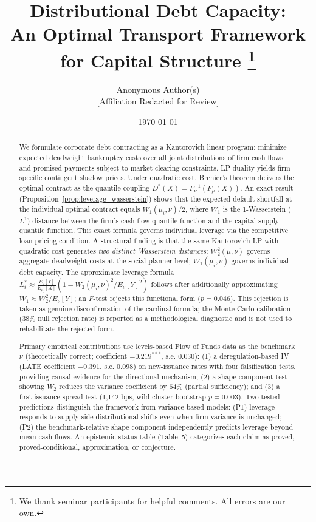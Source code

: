 \documentclass[12pt]{article}
\title{%
  \textbf{Distributional Debt Capacity:\\
  An Optimal Transport Framework for Capital Structure}%
  \thanks{We thank seminar participants for helpful comments. All errors are our own.}
}
\author{%
  Anonymous Author(s)\\
  \small{[Affiliation Redacted for Review]}
}
\date{\today}
\theoremstyle{definition}
\theoremstyle{remark}
\begin{document}
\maketitle
\thispagestyle{empty}

\begin{abstract}
We formulate corporate debt contracting as a Kantorovich linear program: minimize expected deadweight bankruptcy costs over all joint distributions of firm cash flows and promised payments subject to market-clearing constraints. LP duality yields firm-specific contingent shadow prices. Under quadratic cost, Brenier's theorem delivers the optimal contract as the quantile coupling $D^*(X) = F_\nu^{-1}(F_\mu(X))$. An exact result (Proposition~\ref{prop:leverage_wasserstein}) shows that the expected default shortfall at the individual optimal contract equals $W_1(\mu_i,\nu)/2$, where $W_1$ is the 1-Wasserstein ($L^1$) distance between the firm's cash flow quantile function and the capital supply quantile function. This exact formula governs individual leverage via the competitive loan pricing condition. A structural finding is that the same Kantorovich LP with quadratic cost generates \emph{two distinct Wasserstein distances}: $W_2^2(\mu,\nu)$ governs aggregate deadweight costs at the social-planner level; $W_1(\mu_i,\nu)$ governs individual debt capacity. The approximate leverage formula $L_i^* \approx \frac{E_\nu[Y]}{E_{\mu_i}[X]}(1 - W_2(\mu_i,\nu)^2/E_\nu[Y]^2)$ follows after additionally approximating $W_1 \approx W_2^2/E_\nu[Y]$; an $F$-test rejects this functional form ($p=0.046$). This rejection is taken as genuine disconfirmation of the cardinal formula; the Monte Carlo calibration (38\% null rejection rate) is reported as a methodological diagnostic and is not used to rehabilitate the rejected form.

Primary empirical contributions use levels-based Flow of Funds data as the benchmark $\nu$ (theoretically correct; coefficient $-0.219^{***}$, s.e. $0.030$): (1) a deregulation-based IV (LATE coefficient $-0.391$, s.e. $0.098$) on new-issuance rates with four falsification tests, providing causal evidence for the directional mechanism; (2) a shape-component test showing $W_2$ reduces the variance coefficient by 64\% (partial sufficiency); and (3) a first-issuance spread test (1,142 bps, wild cluster bootstrap $p = 0.003$). Two tested predictions distinguish the framework from variance-based models: (P1) leverage responds to supply-side distributional shifts even when firm variance is unchanged; (P2) the benchmark-relative shape component independently predicts leverage beyond mean cash flows. An epistemic status table (Table~5) categorizes each claim as proved, proved-conditional, approximation, or conjecture.
\end{abstract}
\end{document}
